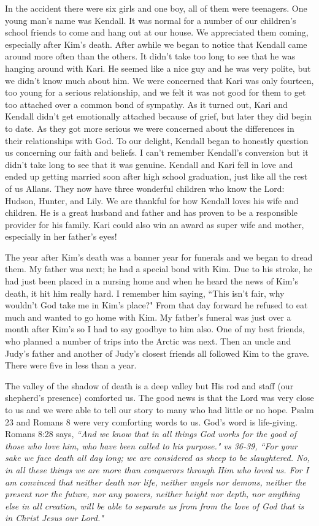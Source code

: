 \documentclass[oneside]{book}
\begin{document}
In the accident there were six girls and one boy, all of them were teenagers. One young man's name was Kendall. It was normal for a number of our children's school friends to come and hang out at our house. We appreciated them coming, especially after Kim's death. After awhile we began to notice that Kendall came around more often than the others. It didn't take too long to see that he was hanging around with Kari. He seemed like a nice guy and he was very polite, but we didn't know much about him. We were concerned that Kari was only fourteen, too young for a serious relationship, and we felt it was not good for them to get too attached over a common bond of sympathy. As it turned out, Kari and Kendall didn't get emotionally attached because of grief, but later they did begin to date. As they got more serious we were concerned about the differences in their relationships with God. To our delight, Kendall began to honestly question us concerning our faith and beliefs. I can't remember Kendall's conversion but it didn't take long to see that it was genuine. Kendall and Kari fell in love and ended up getting married soon after high school graduation, just like all the rest of us Allans. They now have three wonderful children who know the Lord: Hudson, Hunter, and Lily. We are thankful for how Kendall loves his wife and children. He is a great husband and father and has proven to be a responsible provider for his family. Kari could also win an award as super wife and mother, especially in her father's eyes!

The year after Kim's death was a banner year for funerals and we began to dread them. My father was next; he had a special bond with Kim. Due to his stroke, he had just been placed in a nursing home and when he heard the news of Kim's death, it hit him really hard. I remember him saying, ``This isn't fair, why wouldn't God take me in Kim's place?" From that day forward he refused to eat much and wanted to go home with Kim. My father's funeral was just over a month after Kim's so I had to say goodbye to him also. One of my best friends, who planned a number of trips into the Arctic was next. Then an uncle and Judy's father and another of Judy's closest friends all followed Kim to the grave. There were five in less than a year. 

The valley of the shadow of death is a deep valley but His rod and staff (our shepherd's presence) comforted us. The good news is that the Lord was very close to us and we were able to tell our story to many who had little or no hope. Psalm 23 and Romans 8 were very comforting words to us. God's word is life-giving. Romans 8:28 says, \textit{``And we know that in all things God works for the good of those who love him, who have been called to his purpose." vs 36-39, ``For your sake we face death all day long; we are considered as sheep to be slaughtered. No, in all these things we are more than conquerors through Him who loved us. For I am convinced that neither death nor life, neither angels nor demons, neither the present nor the future, nor any powers, neither height nor depth, nor anything else in all creation, will be able to separate us from from the love of God that is in Christ Jesus our Lord."}
\end{document}
